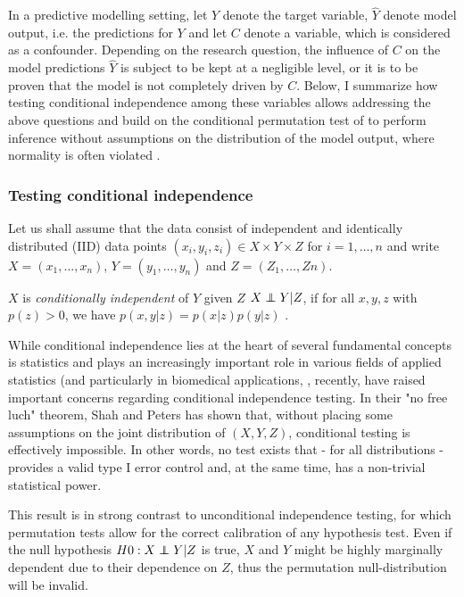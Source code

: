 \documentclass{article}
\begin{document}
In a predictive modelling setting, let $Y$ denote the target variable, $\hat{Y}$ denote model output, i.e. the predictions for $Y$ and let $C$ denote a variable, which is considered as a confounder. Depending on the research question, the influence of $C$ on the model predictions $\hat{Y}$ is subject to be kept at a negligible level, or it is to be proven that the model is not completely driven by $C$. Below, I summarize how testing conditional independence \citep{dawid1979conditional} among these variables allows addressing the above questions and build on the conditional permutation test of \cite{berrett2020conditional} to perform inference without assumptions on the distribution of the model output, where normality is often violated \citep{garcia2009study, kristensen2017whole}.

\subsubsection*{Testing conditional independence}

Let us shall assume that the data consist of independent and identically distributed (IID) data points $(x_i, y_i, z_i) \in X \times Y \times Z$ for $i=1, \dots , n$ and write $X=(x_1, \dots ,x_n)$, $Y=(y_1, \dots, y_n)$ and $Z=(Z_1, \dots, Zn)$. 

$X$ is \emph{conditionally independent} of $Y$ given $Z$ $X \independent Y | Z$, if for all $x, y, z$ with $p(z) > 0$, we have $p(x, y|z) = p(x|z)p(y|z)$ \citep{dawid1979conditional}.

While conditional independence lies at the heart of several fundamental concepts is statistics and  plays an increasingly important role in various fields of applied statistics (and particularly in biomedical applications, \citep{spirtes2000causation, peters2016causal, fiedler2011mediation, candes2016panning}, recently, \cite{shah2020hardness} have raised important concerns regarding conditional independence testing.
In their "no free luch" theorem, Shah and Peters has shown that, without placing some assumptions on the joint distribution of $(X, Y, Z)$, conditional testing is effectively impossible. In other words, no test exists that - for all distributions - provides a valid type I error control and, at the same time, has a non-trivial statistical power.

This result is in strong contrast to unconditional independence testing, for which permutation tests  \citep{pitman1937significance, fisher1942189} allow for the correct calibration of any hypothesis test. Even if the null hypothesis $H0 :X \independent Y|Z$ is true, $X$ and $Y$ might be highly marginally dependent due to their dependence on $Z$,  thus the permutation null-distribution will be invalid.
\end{document}

